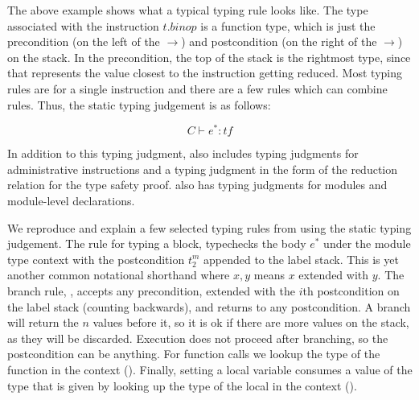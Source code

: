 The above example shows what a typical \wasm typing rule looks like.
The type associated with the instruction $t.binop$ is a \wasm function type, which is just the precondition (on the left of the $\rightarrow$) and postcondition (on the right of the $\rightarrow$) on the stack.
In the precondition, the top of the stack is the rightmost type, since that represents the value closest to the instruction getting reduced.
Most typing rules are for a single instruction and there are a few rules which can combine rules.
Thus, the static \wasm typing judgement is as follows:

$$\boxed{C \vdash e^{*} : tf}$$

In addition to this typing judgment, \wasm also includes typing judgments for administrative instructions and a typing judgment in the form of the reduction relation for the \wasm type safety proof.
\wasm also has typing judgments for modules and module-level declarations.

We reproduce and explain a few selected typing rules from \wasm using the static typing judgement.
The rule for typing a block,  typechecks the body $e^{*}$ under the module type context with the postcondition $t_2^{m}$ appended to the label stack.
This is yet another common notational shorthand where $x,y$ means $x$ extended with $y$.
The branch rule, , accepts any precondition, extended with the $i$th postcondition on the label stack (counting backwards), and returns to any postcondition.
A branch will return the $n$ values before it, so it is ok if there are more values on the stack, as they will be discarded.
Execution does not proceed after branching, so the postcondition can be anything.
For function calls we lookup the type of the function in the context ().
Finally, setting a local variable consumes a value of the type that is given by looking up the type of the local in the context ().

\begin{mathpar}




\end{mathpar}

